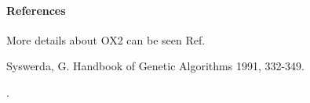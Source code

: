 \documentclass[letterpaper,10pt,english]{sphinxmanual}
\begin{document}
\begin{fulllineitems}
\begin{quote}
\begin{description}
\begin{description}
\end{description}

\end{description}\end{quote}
\paragraph{References}

More details about OX2 can be seen Ref. %
\begin{footnote}[2]\sphinxAtStartFootnote
Syswerda, G. Handbook of Genetic Algorithms 1991, 332-349.
%
\end{footnote}.

\end{fulllineitems}

\end{document}
